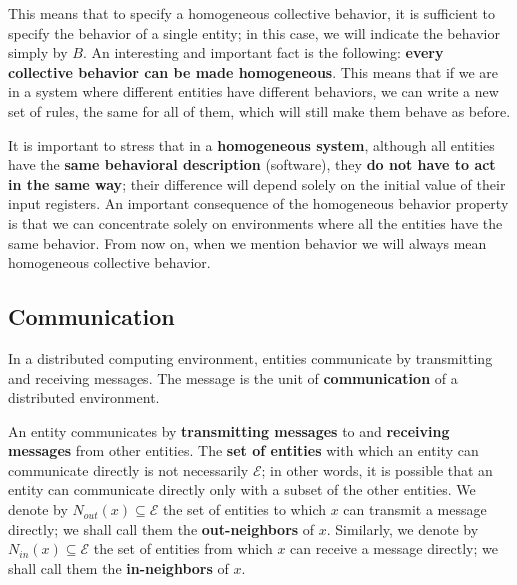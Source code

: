 This means that to specify a homogeneous collective behavior, it is sufficient to specify the behavior of a single entity; in this case, we will indicate the behavior simply by $B$. An interesting and important fact is the following: \textbf{every collective behavior can be made homogeneous}. This means that if we are in a system where different entities have different behaviors, we can write a new set of rules, the same for all of them, which will still make them behave as before.


It is important to stress that in a \textbf{homogeneous system}, although all entities have the \textbf{same behavioral description} (software), they \textbf{do not have to act in the same way}; their difference will depend solely on the initial value of their input registers. An important consequence of the homogeneous behavior property is that we can concentrate solely on environments where all the entities have the same behavior. From now on, when we mention behavior we will always mean homogeneous collective behavior.

\subsection{Communication}
In a distributed computing environment, entities communicate by transmitting and receiving messages. The message is the unit of \textbf{communication} of a distributed environment.  

An entity communicates by \textbf{transmitting messages} to and \textbf{receiving messages} from other entities. The \textbf{set of entities} with which an entity can communicate directly is not necessarily $\mathcal{E}$; in other words, it is possible that an entity can communicate directly only with a subset of the other entities. We denote by $N_{out}(x) \subseteq \mathcal{E}$ the set of entities to which $x$ can transmit a message directly; we shall call them the \textbf{out-neighbors} of $x$. Similarly, we denote by $N_{in}(x) \subseteq \mathcal{E}$ the set of entities from which $x$ can receive a message directly; we shall call them the \textbf{in-neighbors} of $x$. 

